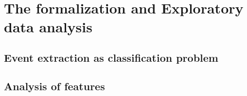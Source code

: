 \chapter{The formalization and Exploratory data analysis}
\label{chap:dataexplore}
\section{Event extraction as classification problem}
\section{Analysis of features}